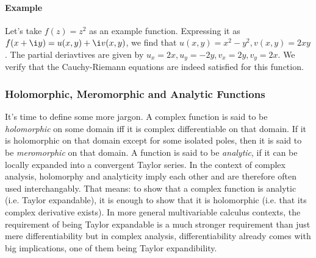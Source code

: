 
\paragraph{Example} Let's take $f(z) = z^2$ as an example function. Expressing it as $f(x + \i y) = u(x,y) + \i v(x,y)$, we find that $u(x,y) = x^2 - y^2, v(x,y) = 2 x y$. The partial deriavtives are given by $u_x = 2 x, u_y = - 2 y, v_x = 2 y, v_y = 2 x$. We verify that the Cauchy-Riemann equations are indeed satisfied for this function.





%



\subsubsection{Holomorphic, Meromorphic and Analytic Functions}
It's time to define some more jargon. A complex function is said to be \emph{holomorphic} on some domain iff it is complex differentiable on that domain. If it is holomorphic on that domain except for some isolated poles, then it is said to be \emph{meromorphic} on that domain. A function is said to be \emph{analytic}, if it can be locally expanded into a convergent Taylor series. In the context of complex analysis, holomorphy and analyticity imply each other and are therefore often used interchangably. That means: to show that a complex function is analytic (i.e. Taylor expandable), it is enough to show that it is holomorphic (i.e. that its complex derivative exists). In more general multivariable calculus contexts, the requirement of being Taylor expandable is a much stronger requirement than just mere differentiability but in complex analysis, differentiability already comes with big implications, one of them being Taylor expandibility.

